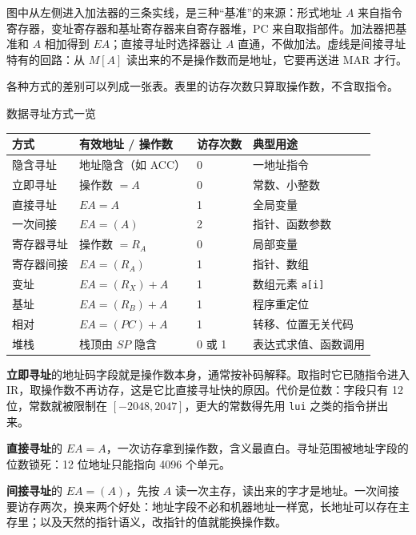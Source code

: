 图中从左侧进入加法器的三条实线，是三种“基准”的来源：形式地址 $A$ 来自指令寄存器，变址寄存器和基址寄存器来自寄存器堆，PC 来自取指部件。加法器把基准和 $A$ 相加得到 $EA$；直接寻址时选择器让 $A$ 直通，不做加法。虚线是间接寻址特有的回路：从 $M[A]$ 读出来的不是操作数而是地址，它要再送进 MAR 才行。

各种方式的差别可以列成一张表。表里的访存次数只算取操作数，不含取指令。

\begin{tablebox}{数据寻址方式一览}
\centering
\small
\begin{tabularx}{\linewidth}{|p{2.1cm}|p{4.5cm}|p{1.7cm}|X|}
\hline
方式 & 有效地址 / 操作数 & 访存次数 & 典型用途 \\
\hline
隐含寻址 & 地址隐含（如 ACC） & 0 & 一地址指令 \\
立即寻址 & 操作数 $=A$ & 0 & 常数、小整数 \\
直接寻址 & $EA=A$ & 1 & 全局变量 \\
一次间接 & $EA=(A)$ & 2 & 指针、函数参数 \\
寄存器寻址 & 操作数 $=R_A$ & 0 & 局部变量 \\
寄存器间接 & $EA=(R_A)$ & 1 & 指针、数组 \\
变址 & $EA=(R_X)+A$ & 1 & 数组元素 \texttt{a[i]} \\
基址 & $EA=(R_B)+A$ & 1 & 程序重定位 \\
相对 & $EA=(PC)+A$ & 1 & 转移、位置无关代码 \\
堆栈 & 栈顶由 $SP$ 隐含 & 0 或 1 & 表达式求值、函数调用 \\
\hline
\end{tabularx}
\end{tablebox}

\textbf{立即寻址}的地址码字段就是操作数本身，通常按补码解释。取指时它已随指令进入 IR，取操作数不再访存，这是它比直接寻址快的原因。代价是位数：字段只有 12 位，常数就被限制在 $[-2048,2047]$，更大的常数得先用 \texttt{lui} 之类的指令拼出来。

\textbf{直接寻址}的 $EA=A$，一次访存拿到操作数，含义最直白。寻址范围被地址字段的位数锁死：12 位地址只能指向 4096 个单元。

\textbf{间接寻址}的 $EA=(A)$，先按 $A$ 读一次主存，读出来的字才是地址。一次间接要访存两次，换来两个好处：地址字段不必和机器地址一样宽，长地址可以存在主存里；以及天然的指针语义，改指针的值就能换操作数。

